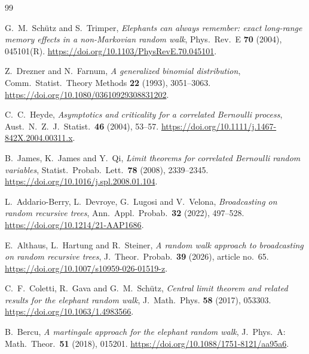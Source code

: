 \documentclass[EJP,preprint]{ejpecp}
\begin{document}
\appendix











\begin{thebibliography}{99}\small\setlength{\baselineskip}{11pt}\setlength{\itemsep}{0pt}\setlength{\parsep}{0pt}

G.~M.~Sch\"utz and S.~Trimper, \emph{Elephants can always remember: exact
long-range memory effects in a non-Markovian random walk}, Phys.\ Rev.\ E
\textbf{70} (2004), 045101(R).
\url{https://doi.org/10.1103/PhysRevE.70.045101}.

Z.~Drezner and N.~Farnum, \emph{A generalized binomial distribution},
Comm.\ Statist.\ Theory Methods \textbf{22} (1993), 3051--3063.
\url{https://doi.org/10.1080/03610929308831202}.

C.~C.~Heyde, \emph{Asymptotics and criticality for a correlated Bernoulli
process}, Aust.\ N.\ Z.\ J.\ Statist.\ \textbf{46} (2004), 53--57.
\url{https://doi.org/10.1111/j.1467-842X.2004.00311.x}.

B.~James, K.~James and Y.~Qi, \emph{Limit theorems for correlated Bernoulli
random variables}, Statist.\ Probab.\ Lett.\ \textbf{78} (2008), 2339--2345.
\url{https://doi.org/10.1016/j.spl.2008.01.104}.

L.~Addario-Berry, L.~Devroye, G.~Lugosi and V.~Velona, \emph{Broadcasting on
random recursive trees}, Ann.\ Appl.\ Probab.\ \textbf{32} (2022), 497--528.
\url{https://doi.org/10.1214/21-AAP1686}.

E.~Althaus, L.~Hartung and R.~Steiner, \emph{A random walk approach to
broadcasting on random recursive trees}, J.\ Theor.\ Probab.\ \textbf{39}
(2026), article no.~65.
\url{https://doi.org/10.1007/s10959-026-01519-z}.

C.~F.~Coletti, R.~Gava and G.~M.~Sch\"utz, \emph{Central limit theorem and
related results for the elephant random walk}, J.~Math.~Phys. \textbf{58}
(2017), 053303.
\url{https://doi.org/10.1063/1.4983566}.

B.~Bercu, \emph{A martingale approach for the elephant random walk},
J.\ Phys.\ A: Math.\ Theor.\ \textbf{51} (2018), 015201.
\url{https://doi.org/10.1088/1751-8121/aa95a6}.


\end{thebibliography}
\end{document}
